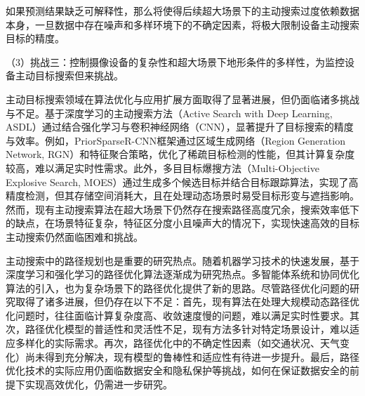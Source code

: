 如果预测结果缺乏可解释性，那么将使得后续超大场景下的主动搜索过度依赖数据本身，一旦数据中存在噪声和多样环境下的不确定因素，将极大限制设备主动搜索目标的精度。


（3）挑战三：控制摄像设备的复杂性和超大场景下地形条件的多样性，为监控设备主动目标搜索但来挑战。

主动目标搜索领域在算法优化与应用扩展方面取得了显著进展，但仍面临诸多挑战与不足。基于深度学习的主动搜索方法\cite{DBLP:conf/iclr/HottungKT22}（Active Search with Deep Learning, ASDL）通过结合强化学习与卷积神经网络（CNN），显著提升了目标搜索的精度与效率。例如，PriorSparseR-CNN框架\cite{wang2024priorsparse}通过区域生成网络（Region Generation Network, RGN）和特征聚合策略，优化了稀疏目标检测的性能，但其计算复杂度较高，难以满足实时性需求。此外，多目目标爆搜方法（Multi-Objective Explosive Search, MOES）\cite{moes2024}通过生成多个候选目标并结合目标跟踪算法，实现了高精度检测，但其存储空间消耗大，且在处理动态场景时易受目标形变与遮挡影响。
然而，现有主动搜索算法在超大场景下仍然存在搜索路径高度冗余，搜索效率低下的缺点，在场景特征复杂，特征区分度小且噪声大的情况下，实现快速高效的目标主动搜索仍然面临困难和挑战。

主动搜索中的路径规划也是重要的研究热点。随着机器学习技术的快速发展，基于深度学习和强化学习的路径优化算法逐渐成为研究热点\cite{zheng2023distributed,cui2024multi,fang2024improved}。多智能体系统和协同优化算法的引入，也为复杂场景下的路径优化提供了新的思路。尽管路径优化问题的研究取得了诸多进展，但仍存在以下不足：首先，现有算法在处理大规模动态路径优化问题时，往往面临计算复杂度高、收敛速度慢的问题，难以满足实时性要求。其次，路径优化模型的普适性和灵活性不足，现有方法多针对特定场景设计，难以适应多样化的实际需求。再次，路径优化中的不确定性因素（如交通状况、天气变化）尚未得到充分解决，现有模型的鲁棒性和适应性有待进一步提升。最后，路径优化技术的实际应用仍面临数据安全和隐私保护等挑战，如何在保证数据安全的前提下实现高效优化，仍需进一步研究。























